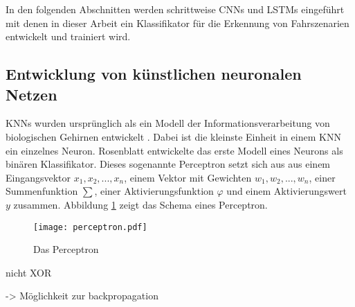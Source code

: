In den folgenden Abschnitten werden schrittweise \acp{CNN} und \acp{LSTM} eingeführt mit denen in dieser Arbeit ein Klassifikator für die Erkennung von Fahrszenarien entwickelt und trainiert wird.


\subsection{Entwicklung von künstlichen neuronalen Netzen}
\label{grundlagen_nn_entwicklung}

\acp{KNN} wurden ursprünglich als ein Modell der Informationsverarbeitung von biologischen Gehirnen entwickelt \cite{mcculloch1943logical}. Dabei ist die kleinste Einheit in einem \ac{KNN} ein einzelnes Neuron. Rosenblatt \cite{rosenblatt1958perceptron} entwickelte das erste Modell eines Neurons als binären Klassifikator. Dieses sogenannte Perceptron setzt sich aus aus einem Eingangsvektor $x_1, x_2, ..., x_n$, einem Vektor mit Gewichten $w_1, w_2, ..., w_n$, einer Summenfunktion $\sum$, einer Aktivierungsfunktion $\varphi$ und einem Aktivierungswert $y$ zusammen. Abbildung \ref{fig_perceptron} zeigt das Schema eines Perceptron.

\begin{figure}[h]
\centering
\texttt{[image: perceptron.pdf]}
\caption{Das Perceptron \cite{rosenblatt1958perceptron}}
\label{fig_perceptron}
\end{figure}



nicht XOR \cite{minski1969perceptrons}


-> Möglichkeit zur backpropagation









